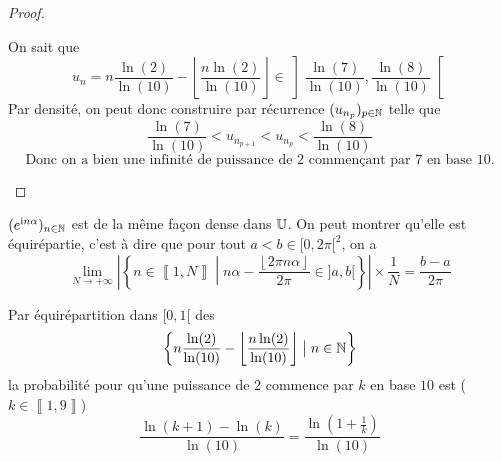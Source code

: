 \begin{proof}
\begin{enumerate}
		On sait que 
		\begin{equation}
			u_{n}=n\frac{\ln(2)}{\ln(10)}-\left\lfloor\frac{n\ln(2)}{\ln(10)}\right\rfloor\in\left]\frac{\ln(7)}{\ln(10)},\frac{\ln(8)}{\ln(10)}\right[
		\end{equation}
		Par densité, on peut donc construire par récurrence $(u_{n_{p}})_{p\in\mathbb{N}}$ telle que 
		\begin{equation}
			\frac{\ln(7)}{\ln(10)}<u_{n_{p+1}}<u_{n_{p}}<\frac{\ln(8)}{\ln(10)}
		\end{equation}
		\begin{equation}
			\boxed{\text{Donc on a bien une infinité de puissance de 2 commençant par 7 en base 10.}}
		\end{equation}
	\end{enumerate}
\end{proof}

\begin{remark}
	$(e^{\mathrm{i}n\alpha})_{n\in\mathbb{N}}$ est de la même façon dense dans $\mathbb{U}$. On peut montrer qu'elle est équirépartie, c'est à dire que pour tout $a<b\in[0,2\pi[^{2}$, on a 
	\begin{equation}
		\lim\limits_{N\to+\infty}\left\vert\left\{n\in\left\llbracket 1,N\right\rrbracket\middle| n\alpha-\frac{\left\lfloor 2\pi n\alpha\right\rfloor}{2\pi}\in]a,b[\right\}\right\vert\times\frac{1}{N}=\frac{b-a}{2\pi}
	\end{equation}
\end{remark}

\begin{remark}
	Par équirépartition dans $[0,1[$ des 
	\begin{equation}
		\left\{n\frac{\ln(2)}{\ln(10)}-\left\lfloor\frac{n\ln(2)}{\ln(10)}\right\rfloor\bigm| n\in\mathbb{N}\right\}
	\end{equation}
	la probabilité pour qu'une puissance de $2$ commence par $k$ en base $10$ est ($k\in\left\llbracket 1,9\right\rrbracket$)
	\begin{equation}
		\frac{\ln(k+1)-\ln(k)}{\ln(10)}=\frac{\ln(1+\frac{1}{k})}{\ln(10)}
	\end{equation}
\end{remark}

